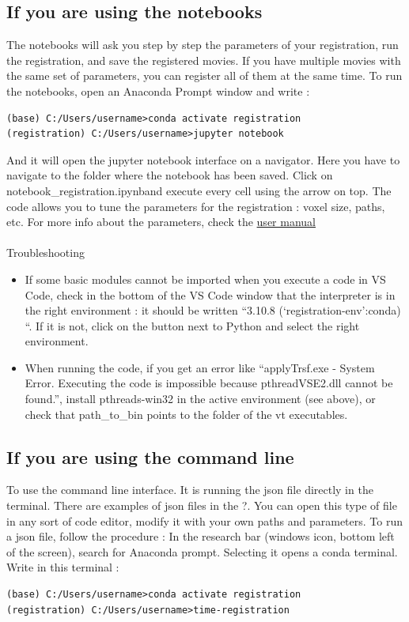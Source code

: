 \documentclass[11pt]{article}
\begin{document}
\subsection{If you are using the notebooks}
The notebooks will ask you step by step the parameters of your registration, run the registration, and save the registered movies. If you have multiple movies with the same set of parameters, you can register all of them at the same time. To run the notebooks, open an Anaconda Prompt window and write :
\begin{verbatim}
(base) C:/Users/username>conda activate registration
(registration) C:/Users/username>jupyter notebook
\end{verbatim}

And it will open the jupyter notebook interface on a navigator.
Here you have to navigate to the folder where the notebook has been saved.
Click on notebook\_registration.ipynband execute every  cell using the arrow on top.
The code allows you to tune the parameters for the registration : voxel size, paths, etc.
For more info about the parameters, check the \href{https:/github.com/GuignardLab/registration-tools/blob/master/User-manual/user-manual.pdf}{user manual}

\paragraph{}Troubleshooting
\begin{itemize}
\item[-]If some basic modules cannot be imported when you execute a code in VS Code, check in the bottom of the VS Code window that the interpreter is in the right environment : it should be written “3.10.8 (‘registration-env’:conda) “. If it is not, click on the button next to Python and select the right environment. 
\item[-]When running the code, if you get an error like “applyTrsf.exe - System Error. Executing the code is impossible because pthreadVSE2.dll cannot be found.”, install pthreads-win32 in the active environment (see above), or check that path\_to\_bin points to the folder of the vt executables.
\end{itemize}
\subsection{If you are using the command line}
To use the command line interface. It is running the json file directly in the terminal. There are examples of json files in the ?. You can open this type of file in any sort of code editor, modify it with your own paths and parameters. To run a json file, follow the procedure : In the research bar (windows icon, bottom left of the screen), search for Anaconda prompt. Selecting it opens a conda terminal. Write in this terminal :
\begin{verbatim}
(base) C:/Users/username>conda activate registration
(registration) C:/Users/username>time-registration
\end{verbatim}
\end{document}
